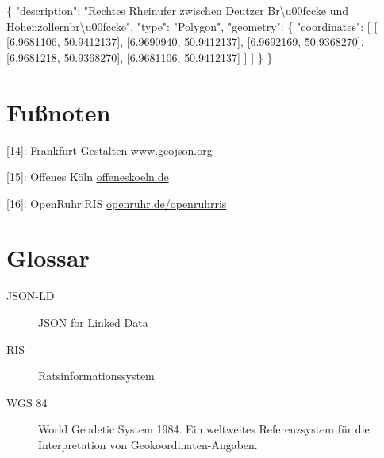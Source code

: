 \documentclass[,a4paper]{article}
\newenvironment{Shaded}{}{}
\newcommand{\DataTypeTok}[1]{\textcolor[rgb]{0.56,0.13,0.00}{{#1}}}
\newcommand{\FloatTok}[1]{\textcolor[rgb]{0.25,0.63,0.44}{{#1}}}
\newcommand{\StringTok}[1]{\textcolor[rgb]{0.25,0.44,0.63}{{#1}}}
\newcommand{\NormalTok}[1]{{#1}}
\begin{document}
\begin{Shaded}
\begin{Highlighting}[]
\NormalTok{\{}
    \DataTypeTok{"description"}\NormalTok{: }\StringTok{"Rechtes Rheinufer zwischen Deutzer}
\StringTok{        Br\textbackslash{}u00fccke und Hohenzollernbr\textbackslash{}u00fccke"}\NormalTok{,}
    \DataTypeTok{"type"}\NormalTok{: }\StringTok{"Polygon"}\NormalTok{,}
    \DataTypeTok{"geometry"}\NormalTok{: \{}
        \DataTypeTok{"coordinates"}\NormalTok{: [}
            \NormalTok{[}
                \NormalTok{[}\FloatTok{6.9681106}\NormalTok{, }\FloatTok{50.9412137}\NormalTok{],}
                \NormalTok{[}\FloatTok{6.9690940}\NormalTok{, }\FloatTok{50.9412137}\NormalTok{],}
                \NormalTok{[}\FloatTok{6.9692169}\NormalTok{, }\FloatTok{50.9368270}\NormalTok{],}
                \NormalTok{[}\FloatTok{6.9681218}\NormalTok{, }\FloatTok{50.9368270}\NormalTok{],}
                \NormalTok{[}\FloatTok{6.9681106}\NormalTok{, }\FloatTok{50.9412137}\NormalTok{]}
            \NormalTok{]}
        \NormalTok{]}
    \NormalTok{\}}
\NormalTok{\}}
\end{Highlighting}
\end{Shaded}

\section{Fußnoten}\label{fuuxdfnoten}

{[}14{]}: Frankfurt Gestalten
\href{http://www.geojson.org/}{www.geojson.org}

{[}15{]}: Offenes Köln \href{http://offeneskoeln.de/}{offeneskoeln.de}

{[}16{]}: OpenRuhr:RIS
\href{http://openruhr.de/openruhrris/}{openruhr.de/openruhrris}

\section{Glossar}\label{glossar}

\begin{description}
\item[JSON-LD]
JSON for Linked Data
\item[RIS]
Ratsinformationssystem
\item[WGS 84]
World Geodetic System 1984. Ein weltweites Referenzsystem für die
Interpretation von Geokoordinaten-Angaben.
\end{description}
\end{document}
